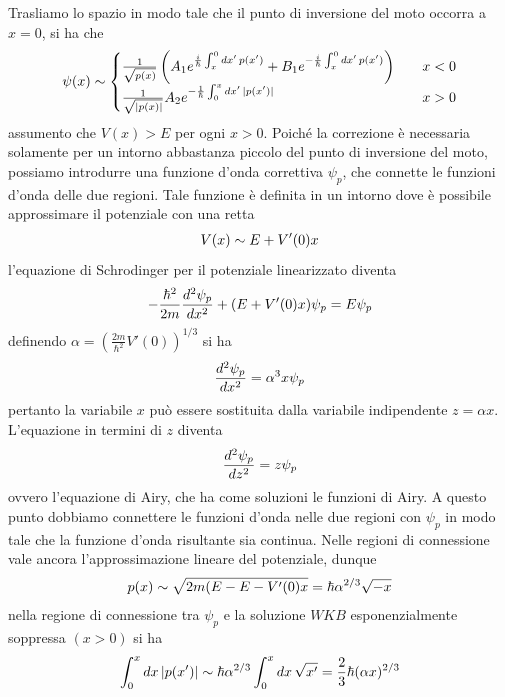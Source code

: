 \documentclass{article}
\begin{document}
Trasliamo lo spazio in modo tale che il punto di inversione del moto occorra a $x = 0$, si ha che
\begin{gather}
    \psi(x) \sim \begin{cases}
        \frac{1}{\sqrt{p(x)}}\left( A_1e^{\frac{i}{\hbar}\int_x^0 dx' \, p(x')} + B_1e^{-\frac{i}{\hbar}\int_x^0 dx' \, p(x')} \right) \quad &x < 0 \\
        \frac{1}{\sqrt{|p(x)|}}A_2e^{-\frac{1}{\hbar}\int_0^x dx' \, |p(x')|} \quad &x > 0 
    \end{cases} \notag
\end{gather}
assumento che $V(x) > E$ per ogni $x > 0$. Poiché la correzione è necessaria solamente per un intorno abbastanza piccolo del punto di inversione del moto, possiamo introdurre una funzione d'onda correttiva $\psi_p$, che connette le funzioni d'onda delle due regioni. Tale funzione è definita in un intorno dove è possibile approssimare il potenziale con una retta
\begin{gather}
    V(x) \sim E + V'(0)x \notag
\end{gather}
l'equazione di Schrodinger per il potenziale linearizzato diventa
\begin{gather}
    -\frac{\hbar^2}{2m}\frac{d^2\psi_p}{dx^2} + (E + V'(0)x)\psi_p = E\psi_p \notag
\end{gather}
definendo $\alpha = \left( \frac{2m}{\hbar^2}V'(0) \right)^{1/3}$ si ha
\begin{gather}
    \frac{d^2\psi_p}{dx^2} = \alpha^3x\psi_p \notag
\end{gather}
pertanto la variabile $x$ può essere sostituita dalla variabile indipendente $z = \alpha x$. L'equazione in termini di $z$ diventa
\begin{gather}
    \frac{d^2\psi_p}{dz^2} = z\psi_p \notag
\end{gather}
ovvero l'equazione di Airy, che ha come soluzioni le funzioni di Airy. A questo punto dobbiamo connettere le funzioni d'onda nelle due regioni con $\psi_p$ in modo tale che la funzione d'onda risultante sia continua. Nelle regioni di connessione vale ancora l'approssimazione lineare del potenziale, dunque
\begin{gather}
    p(x) \sim \sqrt{2m(E - E - V'(0)x} = \hbar\alpha^{2/3}\sqrt{-x} \notag
\end{gather}
nella regione di connessione tra $\psi_p$ e la soluzione $WKB$ esponenzialmente soppressa $(x > 0)$ si ha
\begin{gather}
    \int_0^x dx \, |p(x')| \sim \hbar\alpha^{2/3}\int_0^x dx \, \sqrt{x'} = \frac{2}{3}\hbar(\alpha x)^{2/3} \notag
\end{gather}
\end{document}
